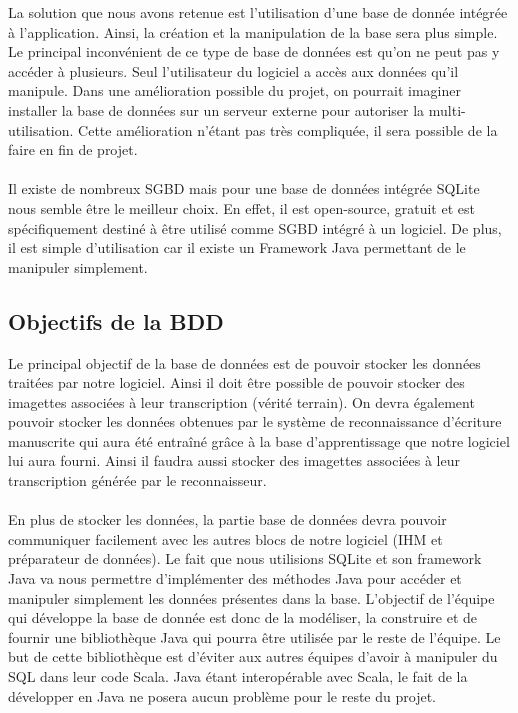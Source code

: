 La solution que nous avons retenue est l’utilisation d’une base de donnée intégrée à l’application. Ainsi, la création et la manipulation de la base sera plus simple. Le principal inconvénient de ce type de base de données est qu’on ne peut pas y accéder à plusieurs. Seul l’utilisateur du logiciel a accès aux données qu’il manipule.
Dans une amélioration possible du projet, on pourrait imaginer installer la base de données sur un serveur externe pour autoriser la multi-utilisation. Cette amélioration n’étant pas très compliquée, il sera possible de la faire en fin de projet.

\paragraph{}

Il existe de nombreux SGBD mais pour une base de données intégrée SQLite nous semble être le meilleur choix. En effet, il est open-source, gratuit et est spécifiquement destiné à être utilisé comme SGBD intégré à un logiciel. De plus, il est simple d’utilisation car il existe un Framework Java permettant de le manipuler simplement.

\subsection{Objectifs de la BDD}

Le principal objectif de la base de données est de pouvoir stocker les données traitées par notre logiciel. Ainsi il doit être possible de pouvoir stocker des imagettes associées à leur transcription (vérité terrain). On devra également pouvoir stocker les données obtenues par le système de reconnaissance d’écriture manuscrite qui aura été entraîné grâce à la base d’apprentissage que notre logiciel lui aura fourni. Ainsi il faudra aussi stocker des imagettes associées à leur transcription générée par le reconnaisseur. 

\paragraph{}

En plus de stocker les données, la partie base de données devra pouvoir communiquer facilement avec les autres blocs de notre logiciel (IHM et préparateur de données). Le fait que nous utilisions SQLite et son framework Java va nous permettre d’implémenter des méthodes Java pour accéder et manipuler simplement les données présentes dans la base. L’objectif de l’équipe qui développe la base de donnée est donc de la modéliser, la construire et de fournir une bibliothèque Java qui pourra être utilisée par le reste de l’équipe. Le but de cette bibliothèque est d’éviter aux autres équipes d’avoir à manipuler du SQL dans leur code Scala. Java étant interopérable avec Scala, le fait de la développer en Java ne posera aucun problème pour le reste du projet.

